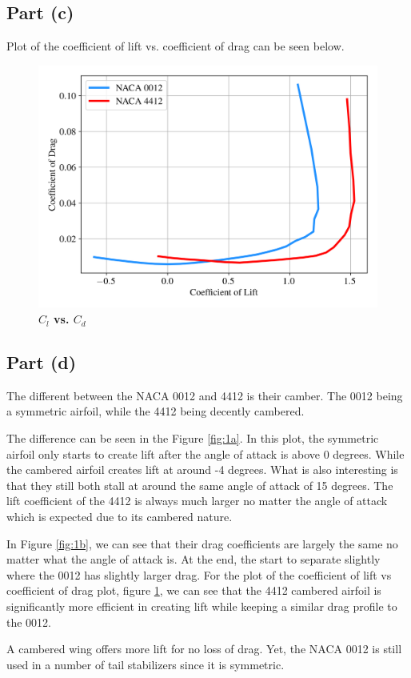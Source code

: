 \begin{singlespace}
\subsection{Part (c)}
Plot of the coefficient of lift vs. coefficient of drag can be seen below.
\begin{figure}[H]
        \centering
        \includegraphics[width=.7\textwidth]{homeworks/homework3/george/plots/problem1_c.png}
        \caption{\textbf{$C_l$ vs. $C_d$}}
        \label{fig:1c}
\end{figure}
\subsection{Part (d)}
The different between the NACA 0012 and 4412 is their camber. The 0012 being a symmetric airfoil, while the 4412 being decently cambered. 

The difference can be seen in the Figure \ref{fig:1a}. In this plot, the symmetric airfoil only starts to create lift after the angle of attack is above 0 degrees. While the cambered airfoil creates lift at around -4 degrees. What is also interesting is that they still both stall at around the same angle of attack of 15 degrees. The lift coefficient of the 4412 is always much larger no matter the angle of attack which is expected due to its cambered nature. 

In Figure \ref{fig:1b}, we can see that their drag coefficients are largely the same no matter what the angle of attack is. At the end, the start to separate slightly where the 0012 has slightly larger drag.
For the plot of the coefficient of lift vs coefficient of drag plot, figure \ref{fig:1c}, we can see that the 4412 cambered airfoil is significantly more efficient in creating lift while keeping a similar drag profile to the 0012. 

A cambered wing offers more lift for no loss of drag. Yet, the NACA 0012 is still used in a number of tail stabilizers since it is symmetric.

\end{singlespace}
